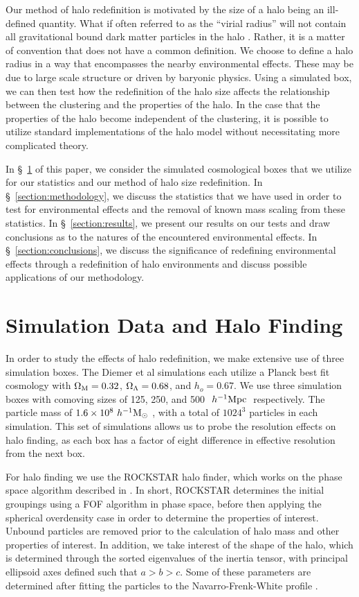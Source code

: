 \documentclass[usenatbib,usegraphicx,letterpaper]{mn2e}
\begin{document}
Our method of halo redefinition is motivated by the size of a halo being an ill-defined quantity. What if often referred to as the ``virial radius'' will not contain all gravitational bound dark matter particles in the halo \citep{kazan06}. Rather, it is a matter of convention that does not have a common definition. We choose to define a halo radius in a way that encompasses the nearby environmental effects. These may be due to large scale structure or driven by baryonic physics. Using a simulated box, we can then test how the redefinition of the halo size affects the relationship between the clustering and the properties of the halo. In the case that the properties of the halo become independent of the clustering, it is possible to utilize standard implementations of the halo model without necessitating more complicated theory.
 
In \S~\ref{section:data} of this paper, we consider the simulated cosmological boxes that we utilize for our statistics and our method of halo size redefinition. In \S~\ref{section:methodology}, we discuss the statistics that we have used in order to test for environmental effects and the removal of known mass scaling from these statistics. In \S~\ref{section:results}, we present our results on our tests and draw conclusions as to the natures of the encountered environmental effects. In \S~\ref{section:conclusions}, we discuss the significance of redefining environmental effects through a redefinition of halo environments and discuss possible applications of our methodology.

\section[]{Simulation Data and Halo Finding}
\label{section:data}

In order to study the effects of halo redefinition, we make extensive use of three simulation boxes. The Diemer et al simulations each utilize a Planck best fit cosmology with $\Omega_{\mathrm{M}} = 0.32$, $\Omega_{\Lambda} = 0.68$, and $h_o = 0.67$. We use three simulation boxes with comoving sizes of 125, 250, and 500 $\ h^{-1}\mathrm{Mpc}~$ respectively. The particle mass of $1.6 \times 10^8 \ h^{-1}\mathrm{M}_{\odot}~$, with a total of $1024^3$ particles in each simulation. This set of simulations allows us to probe the resolution effects on halo finding, as each box has a factor of eight difference in effective resolution from the next box.

For halo finding we use the ROCKSTAR halo finder, which works on the phase space algorithm described in \citet*{behroozi13}. In short, ROCKSTAR determines the initial groupings using a FOF algorithm in phase space, before then applying the spherical overdensity case in order to determine the properties of interest. Unbound particles are removed prior to the calculation of halo mass and other properties of interest. In addition, we take interest of the shape of the halo, which is determined through the sorted eigenvalues of the inertia tensor, with principal ellipsoid axes defined such that $a >b > c$. Some of these parameters are determined after fitting the particles to the Navarro-Frenk-White profile \citep*{nfw97}.
\end{document}
